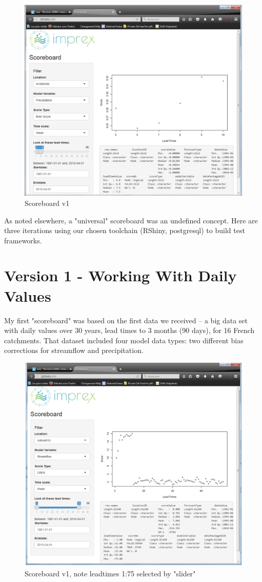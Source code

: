 \documentclass[logos,parttoc,morelanguage=french,morelanguage=german]{orsay-memoire}
\begin{document}
\begin{figure}[ht]
\centering
\includegraphics[width=0.85\linewidth]{images/sbdV1v21notes.png}
  \caption{Scoreboard v1}
  \label{fig:scoreboard v1}
\end{figure}

As noted elsewhere, a "universal" scoreboard was an undefined concept. Here are three iterations using our chosen toolchain (RShiny, postgresql) to build test frameworks.

\section{Version 1 - Working With Daily Values}
My first "scoreboard" was based on the first data we received -- a big data set with daily values over 30 years, lead times to 3 months (90 days), for 16 French catchments. That dataset included four model data types: two different bias corrections for streamflow and precipitation.

\begin{figure}[!ht]
\centering
\includegraphics[width=0.85\linewidth]{images/sbdV1v21notes2.png}
  \caption{Scoreboard v1, note leadtimes 1:75 selected by "slider"}
  \label{fig:scoreboard v1.2}
\end{figure}
\end{document}
